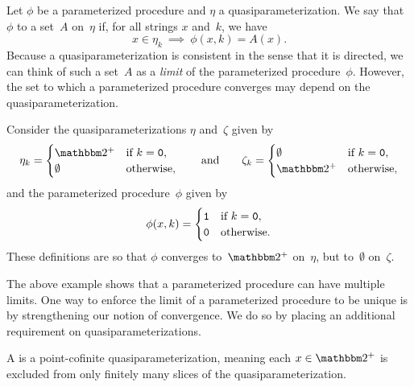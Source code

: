 Let $\phi$ be a parameterized procedure and $\eta$ a quasiparameterization.
We say that $\phi$  to a set~$A$ on~$\eta$ if, for all strings $x$ and~$k$, we have
\begin{equation*}
  x \in \eta_k \:\implies\: \phi(x, k) = A(x).
\end{equation*}
Because a quasiparameterization is consistent in the sense that it is directed, we can think of such a set~$A$ as a \emph{limit} of the parameterized procedure~$\phi$.
However, the set to which a parameterized procedure converges may depend on the quasiparameterization.
\begin{example}
\label{ex:convergence}%
  Consider the quasiparameterizations $\eta$ and~$\zeta$ given by
  \begin{equation*}
    \eta_k \deq \begin{cases}
      \binary^+	& \text{if $k = \bits{0}$}, \\
      \emptyset	& \text{otherwise},
    \end{cases}
    \qquad\text{and}\qquad
    \zeta_k \deq \begin{cases}
      \emptyset	& \text{if $k = \bits{0}$}, \\
      \binary^+	& \text{otherwise},
    \end{cases}
  \end{equation*}
  and the parameterized procedure~$\phi$ given by
  \begin{equation*}
    \phi(x, k) = \begin{cases}
      \textnormal{\texttt{1}}	& \text{if $k = \textnormal{\texttt{0}}$}, \\
      \textnormal{\texttt{0}}	& \text{otherwise}.
    \end{cases}
  \end{equation*}
  These definitions are so that $\phi$ converges to~$\binary^+$ on~$\eta$, but to~$\emptyset$ on~$\zeta$.
\end{example}

The above example shows that a parameterized procedure can have multiple limits.
One way to enforce the limit of a parameterized procedure to be unique is by strengthening our notion of convergence.
We do so by placing an additional requirement on quasiparameterizations.
\begin{definition}
  A  is a point-cofinite quasiparameterization, meaning each $x \in \binary^+$ is excluded from only finitely many slices of the quasiparameterization.
\end{definition}

